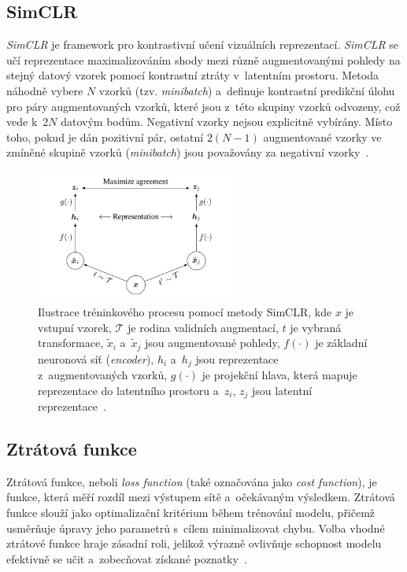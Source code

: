 \subsection{SimCLR}
\label{simclr_text}
\textit{SimCLR} je framework pro kontrastivní učení vizuálních reprezentací. \textit{SimCLR} se učí reprezentace 
maximalizováním shody mezi různě augmentovanými pohledy na stejný datový vzorek pomocí kontrastní ztráty v~latentním prostoru. 
Metoda náhodně vybere $N$ vzorků (tzv. \textit{minibatch}) a~definuje kontrastní predikční úlohu pro páry augmentovaných vzorků, 
které jsou z~této skupiny vzorků odvozeny, což vede k~$2N$ datovým bodům. Negativní vzorky nejsou explicitně vybírány. Místo toho, 
pokud je dán pozitivní pár, ostatní $2(N - 1)$ augmentované vzorky ve zmíněné skupině vzorků (\textit{minibatch}) jsou považovány za negativní vzorky~\cite{simclr}.

\begin{figure}[H]
	\centering
	\includegraphics[width=0.6\textwidth]{obrazky-figures/simclr.png}
	\caption{Ilustrace tréninkového procesu pomocí metody SimCLR, kde $x$ je vstupní vzorek, $\mathcal{T}$ je rodina validních augmentací, $t$ je vybraná transformace, $\tilde{x}_i$ a~$\tilde{x}_j$ jsou augmentované pohledy, $f(\cdot)$ je základní neuronová síť (\textit{encoder}), $h_i$ a~$h_j$ jsou reprezentace z~augmentovaných vzorků, $g(\cdot)$ je projekční hlava, která mapuje reprezentace do latentního prostoru a~$z_i$, $z_j$ jsou latentní reprezentace~\cite{simclr}.}
	\label{simclr}
\end{figure}

\subsection{Ztrátová funkce}
\label{loss_func}
Ztrátová funkce, neboli \textit{loss function} (také označována jako \textit{cost function}), je funkce, která měří rozdíl mezi výstupem sítě a~očekávaným výsledkem. Ztrátová funkce slouží jako optimalizační kritérium během trénování modelu, přičemž usměrňuje úpravy jeho parametrů s~cílem minimalizovat chybu. Volba vhodné ztrátové funkce hraje zásadní roli, jelikož výrazně ovlivňuje schopnost modelu efektivně se učit a~zobecňovat získané poznatky~\cite{NN_DL}.

